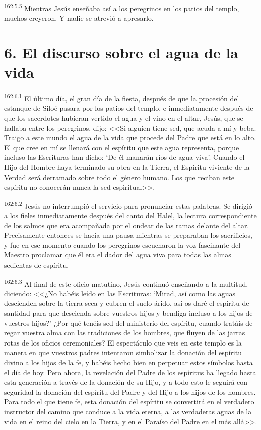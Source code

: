 \par 
\textsuperscript{162:5.5} Mientras Jesús enseñaba así a los peregrinos en los patios del templo, muchos creyeron. Y nadie se atrevió a apresarlo.

\section*{6. El discurso sobre el agua de la vida}
\par 
\textsuperscript{162:6.1} El último día, el gran día de la fiesta, después de que la procesión del estanque de Siloé pasara por los patios del templo, e inmediatamente después de que los sacerdotes hubieran vertido el agua y el vino en el altar, Jesús, que se hallaba entre los peregrinos, dijo: <<Si alguien tiene sed, que acuda a mí y beba. Traigo a este mundo el agua de la vida que procede del Padre que está en lo alto. El que cree en mí se llenará con el espíritu que este agua representa, porque incluso las Escrituras han dicho: `De él manarán ríos de agua viva'. Cuando el Hijo del Hombre haya terminado su obra en la Tierra, el Espíritu viviente de la Verdad será derramado sobre todo el género humano. Los que reciban este espíritu no conocerán nunca la sed espiritual>>.

\par 
\textsuperscript{162:6.2} Jesús no interrumpió el servicio para pronunciar estas palabras. Se dirigió a los fieles inmediatamente después del canto del Halel, la lectura correspondiente de los salmos que era acompañada por el ondear de las ramas delante del altar. Precisamente entonces se hacía una pausa mientras se preparaban los sacrificios, y fue en ese momento cuando los peregrinos escucharon la voz fascinante del Maestro proclamar que él era el dador del agua viva para todas las almas sedientas de espíritu.

\par 
\textsuperscript{162:6.3} Al final de este oficio matutino, Jesús continuó enseñando a la multitud, diciendo: <<¿No habéis leído en las Escrituras: `Mirad, así como las aguas descienden sobre la tierra seca y cubren el suelo árido, así os daré el espíritu de santidad para que descienda sobre vuestros hijos y bendiga incluso a los hijos de vuestros hijos?' ¿Por qué tenéis sed del ministerio del espíritu, cuando tratáis de regar vuestra alma con las tradiciones de los hombres, que fluyen de las jarras rotas de los oficios ceremoniales? El espectáculo que veis en este templo es la manera en que vuestros padres intentaron simbolizar la donación del espíritu divino a los hijos de la fe, y habéis hecho bien en perpetuar estos símbolos hasta el día de hoy. Pero ahora, la revelación del Padre de los espíritus ha llegado hasta esta generación a través de la donación de su Hijo, y a todo esto le seguirá con seguridad la donación del espíritu del Padre y del Hijo a los hijos de los hombres. Para todo el que tiene fe, esta donación del espíritu se convertirá en el verdadero instructor del camino que conduce a la vida eterna, a las verdaderas aguas de la vida en el reino del cielo en la Tierra, y en el Paraíso del Padre en el más allá>>.

